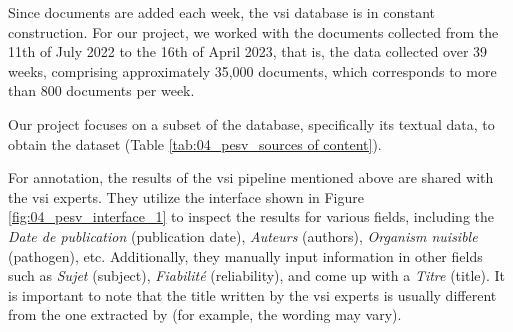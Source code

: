 Since documents are added each week, the \gls{vsi} database is in constant construction. 
For our project, we worked with the documents collected from the 11th of July 2022 to the 16th of April 2023, that is, the data collected over 39 weeks, comprising approximately 35,000 documents, which corresponds to more than 800 documents per week.

Our project focuses on a subset of the \VSI{} database, specifically its textual data, to obtain the \VSI{} dataset  (Table \ref{tab:04_pesv_sources of content}).





\label{vsi_data_annotation}







For annotation, the results of the \gls{vsi} pipeline mentioned above are shared with the \gls{vsi} experts. They utilize the interface shown in Figure \ref{fig:04_pesv_interface_1} to inspect the results for various fields, including the \emph{Date de publication} (publication date), \emph{Auteurs} (authors), \emph{Organism nuisible} (pathogen), etc. Additionally, they manually input information in other fields such as \emph{Sujet} (subject), \emph{Fiabilité} (reliability), and come up with a \emph{Titre} (title).
It is important to note that the title written by the \gls{vsi} experts is usually different from the one extracted by \trafilatura{} (for example, 
the wording may vary). 

